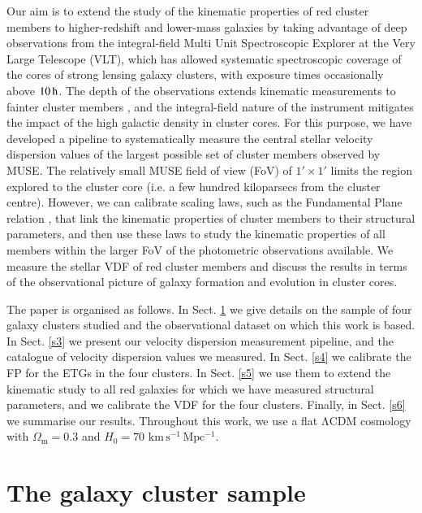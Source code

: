 \documentclass{aa}
\begin{document}
Our aim is to  extend the study of the kinematic properties of red cluster members to higher-redshift and lower-mass galaxies by taking advantage of deep observations from the integral-field Multi Unit Spectroscopic Explorer \citep[MUSE,][]{bacon12} at the Very Large Telescope (VLT), which has allowed systematic spectroscopic coverage of the cores of strong lensing galaxy clusters, with exposure times occasionally above $10 \, \rm h$. The depth of the observations extends kinematic measurements to fainter cluster members \citep[see][]{bergamini21}, and the integral-field nature of the instrument mitigates the impact of the high galactic density in cluster cores. For this purpose, we have developed a pipeline to systematically measure the central stellar velocity dispersion values of the largest possible set of cluster members observed by MUSE. The relatively small MUSE field of view (FoV) of $1'\times1'$ limits the region explored to the cluster core (i.e. a few hundred kiloparsecs from the cluster centre). However, we can calibrate scaling laws, such as the Fundamental Plane relation \citep[][hereafter FP]{dressler87,djorgovski87,bender92}, that link the kinematic properties of cluster members to their structural parameters, and then use these laws to study the kinematic properties of all members within the larger FoV of the photometric observations available. We measure the stellar VDF of red cluster members and discuss the results in terms of the observational picture of galaxy formation and evolution in cluster cores.

The paper is organised as follows. In Sect. \ref{s2} we give details on the sample of four galaxy clusters studied and the observational dataset on which this work is based. In Sect. \ref{s3} we present our velocity dispersion measurement pipeline, and the catalogue of velocity dispersion values we measured. In Sect. \ref{s4} we calibrate the FP for the ETGs in the four clusters. In Sect. \ref{s5} we use them to extend the kinematic study to all red galaxies for which we have measured structural parameters, and we calibrate the VDF for the four clusters. Finally, in Sect. \ref{s6} we summarise our results. Throughout this work, we use a flat $\mathrm{\Lambda}$CDM cosmology with $\Omega_\mathrm{m}=0.3$ and $H_0 = 70$ $\mathrm{km \, s^{-1} \, Mpc^{-1}}$.

\section{The galaxy cluster sample}\label{s2}
\end{document}
